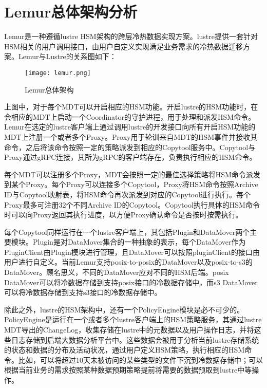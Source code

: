 \section{Lemur总体架构分析}
Lemur是一种遵循lustre HSM架构的跨层冷热数据实现方案。lustre提供一套针对HSM相关的用户调用接口，由用户自定义实现满足业务需求的冷热数据迁移方案。Lemur与Lustre的关系图如下： 

\begin{figure}[!htb]
    \centering
    \texttt{[image: lemur.png]}
    \caption{Lemur总体架构}\label{fig:region-image}
\end{figure}

上图中，对于每个MDT可以开启相应的HSM功能。开启lustre的HSM功能时，在会相应的MDT上启动一个Coordinator的守护进程，用于处理和派发HSM命令。Lemur在选定的lustre客户端上通过调用lustre的开发接口向所有开启HSM功能的MDT上注册一个或者多个Proxy。Proxy用于轮训来自MDT的HSM事件并接收其命令，之后将该命令按照一定的策略派发到相应的Copytool服务中。Copytool与Proxy通过gRPC连接，其所为gRPC的客户端存在，负责执行相应的HSM命令。 

每个MDT可以注册多个Proxy，MDT会按照一定的最佳选择策略将HSM命令派发到某个Proxy。每个Proxy可以连接多个Copytool，Proxy将HSM命令按照Archive ID与Copytool映射表，将HSM命令再次派发到对应的Copytool进行执行。每个Proxy最多可注册32个不同Archive ID的Copytool。Copytool执行具体的HSM命令时可以向Proxy返回其执行进度，以方便Proxy确认命令是否按时按需执行。 

每个Copytool同样运行在一个lustre客户端上，其包括Plugin和DataMover两个主要模块。Plugin是对DataMover集合的一种抽象的表示，每个DataMover作为PluginClient由Plugin模块进行管理，且DataMover可以按照pluginClient的接口由用户进行自定义。当前Lemur支持posix-to-posix的DataMover以及posix-to-s3的DataMover。顾名思义，不同的DataMover应对不同的HSM后端。posix DataMover可以将冷数据存储到支持posix接口的冷数据存储中，而s3 DataMover可以将冷数据存储到支持s3接口的冷数据存储中。 

除此之外，lustre的HSM架构中，还有一个PolicyEngine模块是必不可少的。PolicyEngine是运行在一个或者多个lustre客户端上的HSM策略服务，其通过lustre MDT导出的ChangeLog，收集存储在lustre中的元数据以及用户操作日志，并将这些日志存储到后端大数据分析平台中。这些数据会被用于分析当前lustre存储系统的状态和数据的分布及活动状况，通过用户定义HSM策略，执行相应的HSM命令。比如，可以将超过10天未被访问的某些类型的文件下沉到冷数据存储中；可以根据当前业务的需求按照某种数据预期策略提前将需要的数据预取到lustre中等操作。 
